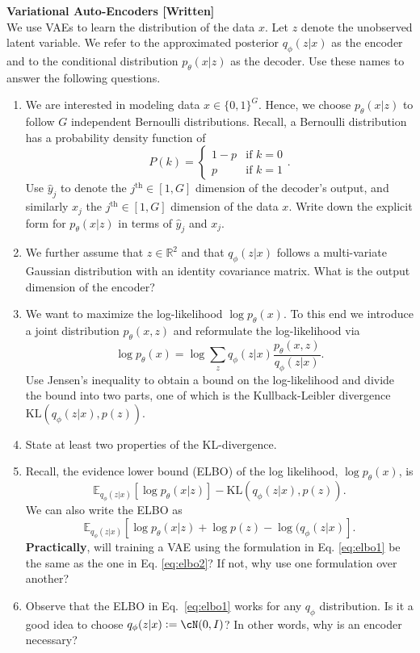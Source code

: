 \begin{Q}
	\textbf{\Large Variational Auto-Encoders [Written]}\\
	We use VAEs to learn the distribution of the data $x$. Let $z$ denote the
	unobserved latent variable. We refer to the approximated posterior $q_\phi(z|x)$ as the encoder
	and to the conditional distribution $p_\theta(x|z)$ as the decoder. Use these names to answer
	the following questions.
	\begin{enumerate}
		\item We are interested in modeling data $x \in \{0,1\}^{G}$. Hence, we choose $p_\theta(x|z)$ to follow $G$ independent Bernoulli distributions. Recall, a Bernoulli distribution has a probability density function of 
		$$
		P(k)= 
		\begin{cases}
		1-p & \text{if } k = 0\\
		p    & \text{if } k = 1
		\end{cases}.
		$$
		Use $\hat{y}_j$ to denote the $j^\text{th}\in[1,G]$ dimension of the decoder's output, and similarly $x_j$ the $j^\text{th}\in[1,G]$ dimension of the data $x$. Write down the explicit form for $p_\theta(x|z)$ in terms of $\hat{y}_j$ and $x_j$. 
		
		\item We further assume that $z \in \mathbb{R}^{2}$ and that $q_\phi(z|x)$ follows a multi-variate Gaussian distribution with an identity covariance matrix. What is the output dimension of the encoder?
		
		\item  We want to maximize the log-likelihood $\log p_\theta(x)$. To this end we introduce a joint distribution $p_\theta(x,z)$ and reformulate the log-likelihood via
		$$
		\log p_\theta(x) = \log \sum_z q_{\phi}(z|x) \frac{p_\theta(x,z)}{q_{\phi}(z|x)}.
		$$
		Use Jensen's inequality to obtain a bound on the log-likelihood and divide the bound into two parts, one of which is the Kullback-Leibler divergence $\text{KL}(q_{\phi}(z|x), p(z)).$
		
		\item State at least two properties of the KL-divergence.
		
		
		\item Recall, the evidence lower bound (ELBO) of the log likelihood, $\log p_{\theta}(x)$, is 
		\begin{equation}\label{eq:elbo1}
		\mathbb{E}_{q_\phi(z|x)} [\log p_\theta(x|z)] - \text{KL}(q_\phi(z|x), p(z)).
		\end{equation}
		We can also write the ELBO as
		\begin{equation}
		\mathbb{E}_{q_\phi(z|x)} [\log p_\theta(x|z) + \log p(z) - \log(q_\phi(z|x)].
		\label{eq:elbo2}
		\end{equation}
		{\bf Practically}, will training a VAE using the formulation in Eq. \ref{eq:elbo1} be the same as the one in Eq. \ref{eq:elbo2}? If not, why use one formulation over another?
		\item Observe that the ELBO in Eq.~\ref{eq:elbo1} works for any $q_\phi$ distribution. Is it a good idea to choose $q_\phi(z|x) := \cN(0, I)$? In other words, why is an encoder necessary?
		

\end{enumerate}
\end{Q}
